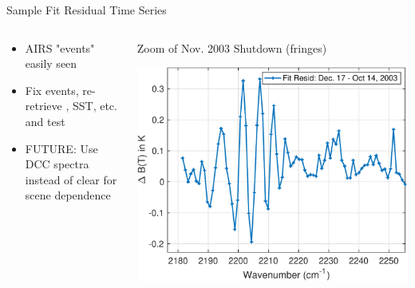 \documentclass[10pt,t]{beamer}
\begin{document}
\begin{frame}[label={sec:org7365180}]{Sample Fit Residual Time Series}
\vspace{-0.2in}

\begin{columns}
\begin{column}{0.5\columnwidth}
\begin{block}{}
\begin{footnotesize}
\begin{itemize}
\item AIRS "events" easily seen
\item Fix events, re-retrieve \cd, SST, etc. and test
\item FUTURE: Use DCC spectra instead of clear for scene dependence
\end{itemize}
\end{footnotesize}
\end{block}
\end{column}

\begin{column}{0.5\columnwidth}
\begin{block}{\footnotesize Zoom of Nov. 2003 Shutdown (fringes)}
\vspace{-0.1in}
\begin{center}
\includegraphics[width=0.85\linewidth]{./Figs/Pdf/resid_spectrum_dec17_minus_oct14_2003_swzoom.pdf}
\end{center}
\end{block}
\end{column}
\end{columns}
\end{frame}
\end{document}
